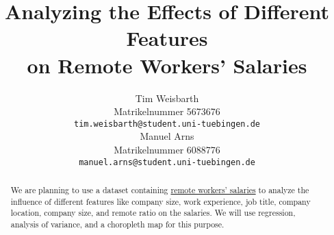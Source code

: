 \documentclass{article}
\title{Analyzing the Effects of Different Features\\ on Remote Workers' Salaries}
\author{%
  Tim Weisbarth\\
  Matrikelnummer 5673676 \\
  \texttt{tim.weisbarth@student.uni-tuebingen.de} \\
  \And
  Manuel Arns\\
  Matrikelnummer 6088776\\
  \texttt{manuel.arns@student.uni-tuebingen.de} \\
}
\begin{document}
\maketitle

\begin{abstract}
  We are planning to use a dataset containing \href{https://salaries.ai-jobs.net/download/}{remote workers' salaries} to analyze the influence of different features like company size, work experience, job title, company location, company size, and remote ratio on the salaries. We will use regression, analysis of variance, and a choropleth map for this purpose.
\end{abstract}
\end{document}
